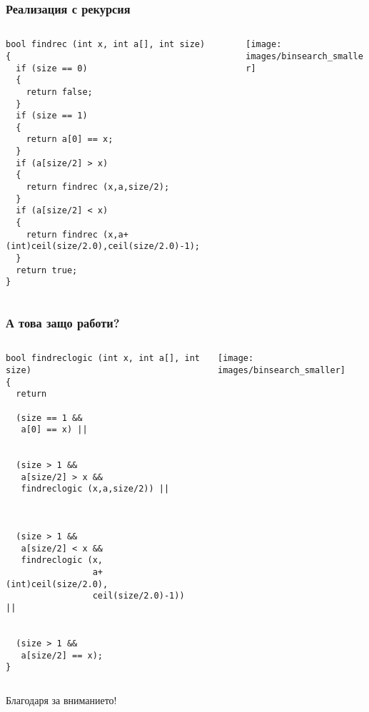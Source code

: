 \documentclass{beamer}
\begin{document}
\begin{frame}[fragile]
\frametitle{Реализация с рекурсия}



\begin{columns}[t]
  \begin{column}{0.5\textwidth}

\begin{lstlisting}
bool findrec (int x, int a[], int size)
{
  if (size == 0)
  {
    return false;
  }
  if (size == 1)
  {
    return a[0] == x;
  }
  if (a[size/2] > x)
  {
    return findrec (x,a,size/2);
  }
  if (a[size/2] < x)
  {
    return findrec (x,a+(int)ceil(size/2.0),ceil(size/2.0)-1);
  }
  return true;
}
\end{lstlisting}


  \end{column}
  \begin{column}{0.5\textwidth}
\vspace*{-1pt}
\hspace*{-50pt}
\texttt{[image: images/binsearch\_smaller]} 

  \end{column}
\end{columns}



\end{frame}


\begin{frame}[fragile]
\frametitle{А това защо работи?}



\begin{columns}[t]
  \begin{column}{0.5\textwidth}

\begin{lstlisting}
bool findreclogic (int x, int a[], int size)
{
  return 
  
  (size == 1 && 
   a[0] == x) ||


  (size > 1 && 
   a[size/2] > x && 
   findreclogic (x,a,size/2)) ||



  (size > 1 && 
   a[size/2] < x && 
   findreclogic (x,
                 a+(int)ceil(size/2.0),
                 ceil(size/2.0)-1))  ||
  

  (size > 1 && 
   a[size/2] == x);
}
\end{lstlisting}


  \end{column}
  \begin{column}{0.5\textwidth}
\vspace*{-1pt}
\hspace*{-50pt}
\texttt{[image: images/binsearch\_smaller]} 

  \end{column}
\end{columns}



\end{frame}



\begin{frame}
\centerline{Благодаря за вниманието!}
\end{frame}
\end{document}
